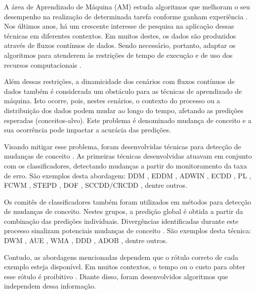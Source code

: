 \documentclass[qual, classic, a4paper]{ufbathesis}
\begin{document}
A área de Aprendizado de Máquina (AM) estuda algoritmos que melhoram o seu desempenho na realização de determinada tarefa conforme ganham experiência \cite{Mitchell:1997:ML:541177}.
Nos últimos anos, há um crescente interesse de pesquisa na aplicação dessas técnicas em diferentes contextos.
Em muitos destes, os dados são produzidos através de fluxos contínuos de dados.
Sendo necessário, portanto, adaptar os algoritmos para atenderem às restrições de tempo de execução e de uso dos recursos computacionais \cite{Bifet:2009:ALM:1656274.1656287}.

Além dessas restrições, a dinamicidade dos cenários com fluxos contínuos de dados também é considerada um obstáculo para as técnicas de aprendizado de máquina.
Isto ocorre, pois, nestes cenários, o contexto do processo ou a distribuição dos dados podem mudar ao longo do tempo, afetando as predições esperadas (conceitos-alvo).
Este problema é denominado mudança de conceito \cite{Gama:2010:KDD:1855075} e a sua ocorrência pode impactar a acurácia das predições.

Visando mitigar esse problema, foram desenvolvidas técnicas para detecção de mudanças de conceito \cite{Gama:2014:SCD:2597757.2523813}.
As primeiras técnicas desenvolvidas atuavam em conjunto com os classificadores,  
detectando mudanças a partir do monitoramento da taxa de erro.
São exemplos desta abordagem: DDM \cite{GamaMCR04}, EDDM \cite{EDDM},  
ADWIN \cite{BifetG07}, ECDD \cite{Ross:2012:EWM:2076039.2076307}, 
PL \cite{Bach:PL:2008}, FCWM \cite{FCWM}, STEPD \cite{STEPD}, DOF \cite{Sobhani:2011:NDD:2045295.2045309}, 
SCCDD/CRCDD \cite{daCosta:2016:UDS:2956219.2956389}, dentre outros.

Os comitês de classificadores também foram utilizados em métodos para detecção de mudanças de conceito.
Nestes grupos, a predição global é obtida a partir da combinação das predições individuais.
Divergências identificadas durante este processo sinalizam potenciais mudanças de conceito \cite{Gama:2014:SCD:2597757.2523813}.
São exemplos desta técnica:
DWM \cite{Kolter:2007:DWM:1314498.1390333}, AUE \cite{AUE}, 
WMA \cite{Blum1997}, DDD \cite{Minku:2012:DNE:2197077.2197204}, ADOB \cite{deCarvalhoSantos:2014:SUR:3120352.3120365}, dentre outros.

Contudo, as abordagens mencionadas dependem que o rótulo correto de cada exemplo esteja disponível.
Em muitos contextos, o tempo ou o custo para obter esse rótulo é proibitivo \cite{Aggarwal:2006:DSM:1196418}.
Diante disso, foram desenvolvidos algoritmos que independem dessa informação.
\end{document}

